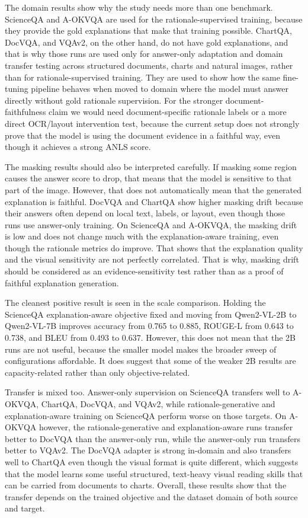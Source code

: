 \documentclass[12pt,bibliography=totoc,listof=totoc,BCOR=5mm,DIV=12,oneside,open=any]{scrbook}
\begin{document}
The domain results show why the study needs more than one benchmark.
ScienceQA and A-OKVQA are used for the rationale-supervised training, because they provide the gold explanations that make that training possible.
ChartQA, DocVQA, and VQAv2, on the other hand, do not have gold explanations, and that is why those runs are used only for answer-only adaptation 
and domain transfer testing across structured documents, charts and natural images, rather than for rationale-supervised training.
They are used to show how the same fine-tuning pipeline behaves when moved to domain where the model must answer directly without gold rationale supervision.
For the stronger document-faithfulness claim we would need document-specific rationale labels or a more direct OCR/layout intervention test, because the current setup does not strongly prove that the model is using the document evidence in a faithful way, even though it achieves a strong ANLS score.

The masking results should also be interpreted carefully.
If masking some region causes the answer score to drop, that means that the model is sensitive to that part of the image.
However, that does not automatically mean that the generated explanation is faithful.
DocVQA and ChartQA show higher masking drift because their answers often depend on local text, labels, or layout, even though those runs use answer-only training.
On ScienceQA and A-OKVQA, the masking drift is low and does not change much with the explanation-aware training, even though the rationale metrics do improve.
That shows that the explanation quality and the visual sensitivity are not perfectly correlated.
That is why, masking drift should be considered as an evidence-sensitivity test rather than as a proof of faithful explanation generation.

The cleanest positive result is seen in the scale comparison.
Holding the ScienceQA explanation-aware objective fixed and moving from Qwen2-VL-2B to Qwen2-VL-7B improves accuracy from 0.765 to 0.885, ROUGE-L from 0.643 to 0.738, and BLEU from 0.493 to 0.637.
However, this does not mean that the 2B runs are not useful, because the smaller model makes the broader sweep of configurations affordable.
It does suggest that some of the weaker 2B results are capacity-related rather than only objective-related.

Transfer is mixed too.
Answer-only supervision on ScienceQA transfers well to A-OKVQA, ChartQA, DocVQA, and VQAv2, while rationale-generative and explanation-aware training on ScienceQA perform worse on those targets.
On A-OKVQA however, the rationale-generative and explanation-aware runs transfer better to DocVQA than the answer-only run, while the answer-only run transfers better to VQAv2.
The DocVQA adapter is strong in-domain and also transfers well to ChartQA even though the visual format is quite different, which suggests that the model learns some useful structured, text-heavy visual reading skills that can be carried from documents to charts.
Overall, these results show that the transfer depends on the trained objective and the dataset domain of both source and target.
\end{document}
